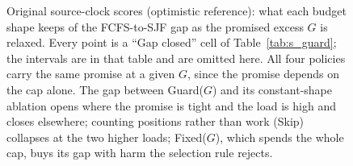 \begin{figure}[htbp]
{}
\caption{Original source-clock scores (optimistic reference): what each budget shape keeps of the FCFS-to-SJF gap as the promised
excess $G$ is relaxed. Every point is a ``Gap closed'' cell of
Table~\ref{tab:s_guard}; the intervals are in that table and are omitted here.
All four policies carry the same promise at a given $G$, since the promise
depends on the cap alone. The gap between Guard($G$) and its constant-shape
ablation opens where the promise is tight and the load is high and closes
elsewhere; counting positions rather than work (Skip) collapses at the two higher
loads; Fixed($G$), which spends the whole cap, buys its gap with harm the
selection rule rejects.}
\label{fig:gapvsg}
\end{figure}
